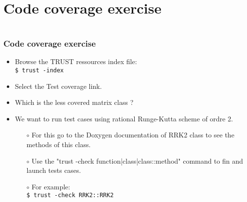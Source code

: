 \documentclass[10pt, hyperref={unicode=true,pdfusetitle, bookmarks=true,bookmarksnumbered=false,bookmarksopen=false, breaklinks=false,pdfborder={0 0 1},backref=true,colorlinks=true,linkcolor=darkblue,pageanchor, urlcolor=darkblue}]{beamer}
\begin{document}



\section{{\bf{Code coverage exercise}}}
\begin{frame}
\begin{columns}[c] 
\tableofcontents[sections={1-3},currentsection, currentsubsection]
\tableofcontents[sections={4-8},currentsection, currentsubsection]
\end{columns}
\end{frame}
\begin{frame}
\frametitle{Code coverage exercise}
\begin{block}{}

\begin{itemize}
\item Browse the TRUST ressources index file:\\
\texttt{\$ trust -index}

\item Select the Test coverage link.

\item Which is the less covered matrix class ?

\item We want to run test cases using rational Runge-Kutta scheme of ordre 2.

\begin{itemize}
    \item [$\circ$] For this go to the Doxygen documentation of RRK2 class to see the methods of this class.
    \item [$\circ$] Use the "trust -check function|class|class::method" command to fin and launch tests cases.
    \item [$\circ$] For example: \\
    \texttt{\$ trust -check RRK2::RRK2}
\end{itemize}
\end{itemize}

\end{block}
\end{frame}
\end{document}
